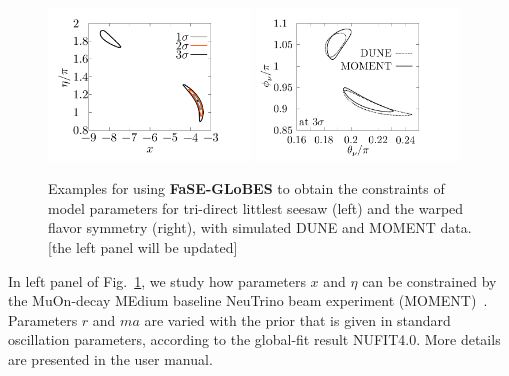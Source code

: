 \documentclass[aps,prd,nofootinbib,preprint]{revtex4}
\begin{document}
\begin{figure}[!h]
 \centering
\includegraphics[width=0.48\textwidth]{Figs/x_eta.pdf}
 \includegraphics[width=0.48\textwidth]{Figs/theta_phi.pdf}
  \caption{\label{fig:constraint}Examples for using \textbf{FaSE-GLoBES} to obtain the constraints of model parameters for tri-direct littlest seesaw (left) and the warped flavor symmetry (right), with simulated DUNE and MOMENT data. {\color{blue}[the left panel will be updated]}}
\end{figure}

In left panel of Fig.~\ref{fig:constraint}, we study how parameters $x$ and $\eta$ can be constrained by the MuOn-decay MEdium baseline NeuTrino beam experiment (MOMENT)~\cite{Cao:2014bea}. 
Parameters $r$ and $ma$ are varied with the prior that is given in standard oscillation parameters, according to the global-fit result NUFIT4.0. More details are presented in the user manual. 

\end{document}
